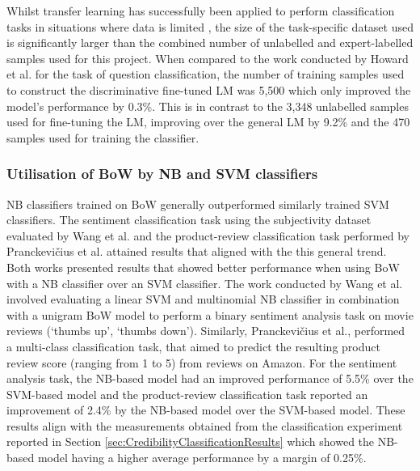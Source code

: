 \documentclass[a4paper,twoside,phd]{BYUPhys}
\begin{document}
Whilst transfer learning has successfully been applied to perform classification tasks in situations where data is limited \cite{Glorot2011} \cite{Radford2018}, the size of the task-specific dataset used is significantly larger than the combined number of unlabelled and expert-labelled samples used for this project. When compared to the work conducted by Howard et al. \cite{Howard2018} for the task of question classification, the number of training samples used to construct the discriminative fine-tuned LM was 5,500 which only improved the model's performance by 0.3\%. This is in contrast to the 3,348 unlabelled samples used for fine-tuning the LM, improving over the general LM by 9.2\% and the 470 samples used for training the classifier. \newline

\subsubsection{Utilisation of BoW by NB and SVM classifiers}

NB classifiers trained on BoW generally outperformed similarly trained SVM classifiers. The sentiment classification task using the subjectivity dataset \cite{Pang2004} evaluated by Wang et al. \cite{Wang2012} and the product-review classification task performed by Pranckevičius et al. \cite{PRANCKEVICIUS2017} attained results that aligned with the this general trend. Both works presented results that showed better performance when using BoW with a NB classifier over an SVM classifier. The work conducted by Wang et al. involved evaluating a linear SVM and multinomial NB classifier in combination with a unigram BoW model to perform a binary sentiment analysis task on movie reviews (`thumbs up', `thumbs down'). Similarly, Pranckevičius   et al., performed a multi-class classification task, that aimed to predict the resulting product review score (ranging from 1 to 5) from reviews on Amazon. For the sentiment analysis task, the NB-based model had an improved performance of 5.5\% over the SVM-based model and the product-review classification task reported an improvement of 2.4\% by the NB-based model over the SVM-based model. These results align with the measurements obtained from the classification experiment reported in Section \ref{sec:CredibilityClassificationResults} which showed the NB-based model having a higher average performance by a margin of 0.25\%. \newline
\end{document}
